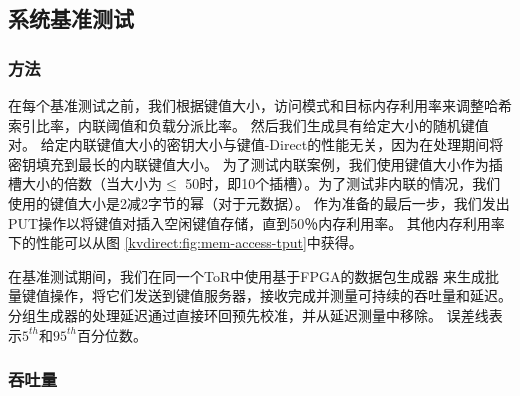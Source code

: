 \subsection{系统基准测试}
\label{kvdirect:sec:system-benchmark}

\subsubsection{方法}

在每个基准测试之前，我们根据键值大小，访问模式和目标内存利用率来调整哈希索引比率，内联阈值和负载分派比率。
然后我们生成具有给定大小的随机键值对。
给定内联键值大小的密钥大小与键值-Direct的性能无关，因为在处理期间将密钥填充到最长的内联键值大小。
为了测试内联案例，我们使用键值大小作为插槽大小的倍数（当大小为$ \leq $ 50时，即10个插槽）。为了测试非内联的情况，我们使用的键值大小是2减2字节的幂（对于元数据）。
作为准备的最后一步，我们发出PUT操作以将键值对插入空闲键值存储，直到50％内存利用率。
其他内存利用率下的性能可以从图 \ref {kvdirect:fig:mem-access-tput}中获得。

在基准测试期间，我们在同一个ToR中使用基于FPGA的数据包生成器 \cite {li2016clicknp}来生成批量键值操作，将它们发送到键值服务器，接收完成并测量可持续的吞吐量和延迟。
分组生成器的处理延迟通过直接环回预先校准，并从延迟测量中移除。
误差线表示$ 5^{th} $和$ 95^{th} $百分位数。

\subsubsection{吞吐量}

